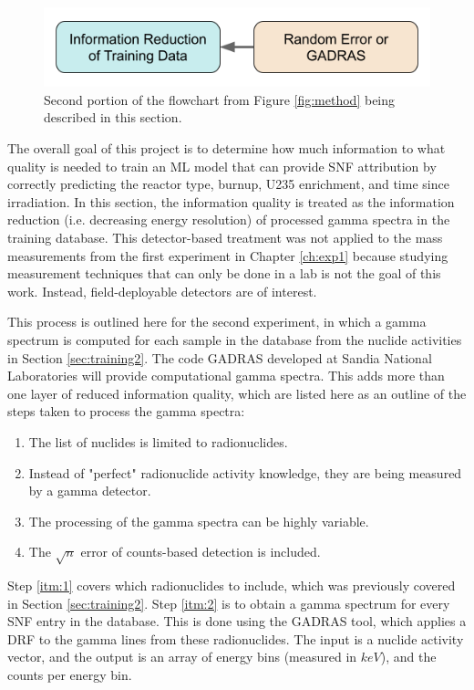 \begin{figure}[H]
  \centering
  \includegraphics[width=0.7\linewidth]{./chapters/exp1/methodology2.png}
  \caption{Second portion of the flowchart from Figure \ref{fig:method} being 
           described in this section.}
\end{figure}

The overall goal of this project is to determine how much information to what
quality is needed to train an \gls{ML} model that can provide \gls{SNF}
attribution by correctly predicting the reactor type, burnup, \gls{U235}
enrichment, and time since irradiation.  In this section, the information
quality is treated as the information reduction (i.e. decreasing energy
resolution) of processed gamma spectra in the training database.  This
detector-based treatment was not applied to the mass measurements from the
first experiment in Chapter \ref{ch:exp1} because studying measurement
techniques that can only be done in a lab is not the goal of this work.
Instead, field-deployable detectors are of interest.

This process is outlined here for the second experiment, in which a gamma
spectrum is computed for each sample in the database from the nuclide
activities in Section \ref{sec:training2}.  The code \gls{GADRAS} \cite{gadras}
developed at Sandia National Laboratories will provide computational gamma
spectra.  This adds more than one layer of reduced information quality, which
are listed here as an outline of the steps taken to process the gamma spectra:
\begin{enumerate}
  \item \label{itm:1} The list of nuclides is limited to radionuclides.
  \item \label{itm:2} Instead of "perfect" radionuclide activity knowledge, 
        they are being measured by a gamma detector.
  \item \label{itm:3} The processing of the gamma spectra can be highly variable.
  \item \label{itm:4} The $\sqrt{n}$ error of counts-based detection is included. 
\end{enumerate}

Step \ref{itm:1} covers which radionuclides to include, which was previously
covered in Section \ref{sec:training2}. Step \ref{itm:2} is to obtain a gamma
spectrum for every \gls{SNF} entry in the database. This is done using the
\gls{GADRAS} tool, which applies a \gls{DRF} to the gamma lines from these
radionuclides. The input is a nuclide activity vector, and the output is an
array of energy bins (measured in $keV$), and the counts per energy bin.

